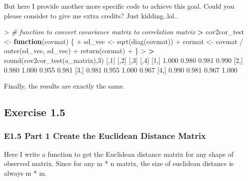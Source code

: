 \documentclass[
]{article}
\newenvironment{Shaded}{\begin{snugshade}}{\end{snugshade}}
\newcommand{\CommentTok}[1]{\textcolor[rgb]{0.56,0.35,0.01}{\textit{#1}}}
\newcommand{\ControlFlowTok}[1]{\textcolor[rgb]{0.13,0.29,0.53}{\textbf{#1}}}
\newcommand{\DecValTok}[1]{\textcolor[rgb]{0.00,0.00,0.81}{#1}}
\newcommand{\ErrorTok}[1]{\textcolor[rgb]{0.64,0.00,0.00}{\textbf{#1}}}
\newcommand{\FloatTok}[1]{\textcolor[rgb]{0.00,0.00,0.81}{#1}}
\newcommand{\FunctionTok}[1]{\textcolor[rgb]{0.00,0.00,0.00}{#1}}
\newcommand{\NormalTok}[1]{#1}
\newcommand{\OtherTok}[1]{\textcolor[rgb]{0.56,0.35,0.01}{#1}}
\newcommand{\SpecialCharTok}[1]{\textcolor[rgb]{0.00,0.00,0.00}{#1}}
\begin{document}
But here I provide another more specific code to achieve this goal.
Could you please consider to give me extra credits? Just kidding..lol..

\begin{Shaded}
\begin{Highlighting}[]
\SpecialCharTok{\textgreater{}} \CommentTok{\# function to convert covariance matrix to correlation matrix}
\ErrorTok{\textgreater{}}\NormalTok{ cov2cor\_test }\OtherTok{\textless{}{-}} \ControlFlowTok{function}\NormalTok{(covmat) \{}
\SpecialCharTok{+}\NormalTok{     sd\_vec }\OtherTok{\textless{}{-}} \FunctionTok{sqrt}\NormalTok{(}\FunctionTok{diag}\NormalTok{(covmat))}
\SpecialCharTok{+}\NormalTok{     cormat }\OtherTok{\textless{}{-}}\NormalTok{ covmat }\SpecialCharTok{/} \FunctionTok{outer}\NormalTok{(sd\_vec, sd\_vec)}
\SpecialCharTok{+}     \FunctionTok{return}\NormalTok{(cormat)}
\SpecialCharTok{+}\NormalTok{ \}}
\SpecialCharTok{\textgreater{}} 
\ErrorTok{\textgreater{}} \FunctionTok{round}\NormalTok{(}\FunctionTok{cov2cor\_test}\NormalTok{(a\_matrix),}\DecValTok{3}\NormalTok{)}
\NormalTok{      [,}\DecValTok{1}\NormalTok{]  [,}\DecValTok{2}\NormalTok{]  [,}\DecValTok{3}\NormalTok{]  [,}\DecValTok{4}\NormalTok{]}
\NormalTok{[}\DecValTok{1}\NormalTok{,] }\FloatTok{1.000} \FloatTok{0.980} \FloatTok{0.981} \FloatTok{0.990}
\NormalTok{[}\DecValTok{2}\NormalTok{,] }\FloatTok{0.980} \FloatTok{1.000} \FloatTok{0.955} \FloatTok{0.981}
\NormalTok{[}\DecValTok{3}\NormalTok{,] }\FloatTok{0.981} \FloatTok{0.955} \FloatTok{1.000} \FloatTok{0.967}
\NormalTok{[}\DecValTok{4}\NormalTok{,] }\FloatTok{0.990} \FloatTok{0.981} \FloatTok{0.967} \FloatTok{1.000}
\end{Highlighting}
\end{Shaded}

Finally, the results are exactly the same.

\hypertarget{exercise-1.5}{%
\subsection{Exercise 1.5}\label{exercise-1.5}}

\hypertarget{e1.5-part-1-create-the-euclidean-distance-matrix}{%
\subsubsection{E1.5 Part 1 Create the Euclidean Distance
Matrix}\label{e1.5-part-1-create-the-euclidean-distance-matrix}}

Here I write a function to get the Euclidean distance matrix for any
shape of observed matrix. Since for any m * n matrix, the size of
euclidean distance is always m * m.
\end{document}

